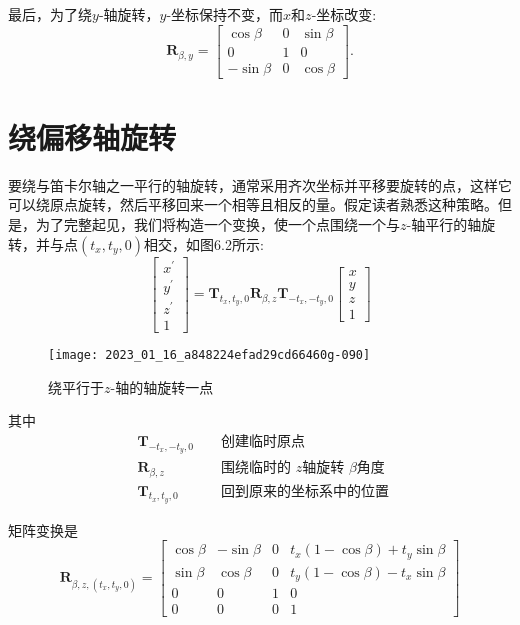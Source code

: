 最后，为了绕$y$-轴旋转，$y$-坐标保持不变，而$x$和$z$-坐标改变:
$$
\mathbf{R}_{\beta, y}=\left[\begin{array}{ccc}
\cos \beta & 0 & \sin \beta \\
0 & 1 & 0 \\
-\sin \beta & 0 & \cos \beta
\end{array}\right] .
$$

\section{绕偏移轴旋转}
要绕与笛卡尔轴之一平行的轴旋转，通常采用齐次坐标并平移要旋转的点，这样它可以绕原点旋转，然后平移回来一个相等且相反的量。假定读者熟悉这种策略。但是，为了完整起见，我们将构造一个变换，使一个点围绕一个与$z$-轴平行的轴旋转，并与点$\left(t_{x}, t_{y}, 0\right)$相交，如图6.2所示:
$$
\left[\begin{array}{c}
x^{\prime} \\
y^{\prime} \\
z^{\prime} \\
1
\end{array}\right]=\mathbf{T}_{t_{x}, t_{y}, 0} \mathbf{R}_{\beta, z} \mathbf{T}_{-t_{x},-t_{y}, 0}\left[\begin{array}{c}
x \\
y \\
z \\
1
\end{array}\right]
$$

\begin{figure}
    \centering
    \texttt{[image: 2023\_01\_16\_a848224efad29cd66460g-090]}
    \caption[short]{绕平行于$z$-轴的轴旋转一点}
\end{figure}

其中
$$
\begin{aligned}
& \mathbf{T}_{-t_{x},-t_{y}, 0} && \text { 创建临时原点 } \\
& \mathbf{R}_{\beta, z} && \text { 围绕临时的 } z \text {轴旋转 }\beta \text{角度} \\
& \mathbf{T}_{t_{x}, t_{y}, 0} && \text { 回到原来的坐标系中的位置 }
\end{aligned}
$$

矩阵变换是
$$
\mathbf{R}_{\beta, z,\left(t_{x}, t_{y}, 0\right)}=\left[\begin{array}{cccc}
\cos \beta & -\sin \beta & 0 & t_{x}(1-\cos \beta)+t_{y} \sin \beta \\
\sin \beta & \cos \beta & 0 & t_{y}(1-\cos \beta)-t_{x} \sin \beta \\
0 & 0 & 1 & 0 \\
0 & 0 & 0 & 1
\end{array}\right]
$$

